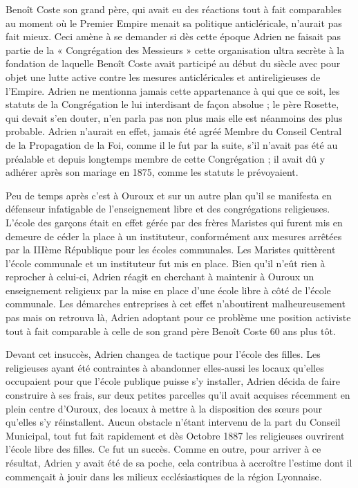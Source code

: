 \documentclass[11pt,a4paper]{report}
\begin{document}
Benoît Coste son grand père, qui avait eu des réactions tout à fait comparables au moment où le Premier Empire menait sa politique anticléricale, n'aurait pas fait mieux. Ceci amène à se demander si dès cette époque Adrien ne faisait pas partie de la « Congrégation des Messieurs » cette organisation ultra secrète à la fondation de laquelle Benoît Coste avait participé au début du siècle avec pour objet une lutte active contre les mesures anticléricales et antireligieuses de l'Empire. Adrien ne mentionna jamais cette appartenance à qui que ce soit, les statuts de la Congrégation le lui interdisant de façon absolue ; le père Rosette, qui devait s'en douter, n'en parla pas non plus mais elle est néanmoins des plus probable. Adrien n'aurait en effet, jamais été agréé Membre du Conseil Central de la Propagation de la Foi, comme il le fut par la suite, s'il n'avait pas été au préalable et depuis longtemps membre de cette Congrégation ; il avait dû y adhérer après son mariage en 1875, comme les statuts le prévoyaient.

Peu de temps après c'est à Ouroux et sur un autre plan qu'il se manifesta en défenseur infatigable de l'enseignement libre et des congrégations religieuses. L'école des garçons était en effet gérée par des frères Maristes qui furent mis en demeure de céder la place à un instituteur, conformément aux mesures arrêtées par la IIIème République pour les écoles communales. Les Maristes quittèrent l'école communale et un instituteur fut mis en place. Bien qu'il n'eût rien à reprocher à celui-ci, Adrien réagit en cherchant à maintenir à Ouroux un enseignement religieux par la mise en place d'une école libre à côté de l'école communale. Les démarches entreprises à cet effet n'aboutirent malheureusement pas mais on retrouva là, Adrien adoptant pour ce problème une position activiste tout à fait comparable à celle de son grand père Benoît Coste 60 ans plus tôt.

Devant cet insuccès, Adrien changea de tactique pour l'école des filles. Les religieuses ayant été contraintes à abandonner elles-aussi les locaux qu'elles occupaient pour que l'école publique puisse s'y installer, Adrien décida de faire construire à ses frais, sur deux petites parcelles qu'il avait acquises récemment en plein centre d'Ouroux, des locaux à mettre à la disposition des sœurs pour qu'elles s'y réinstallent. Aucun obstacle n'étant %
intervenu de la part du Conseil Municipal, tout fut fait rapidement et dès Octobre 1887 les religieuses ouvrirent l'école libre des filles. Ce fut un succès. Comme en outre, pour arriver à ce résultat, Adrien y avait été de sa poche, cela contribua à accroître l'estime dont il commençait à jouir dans les milieux ecclésiastiques de la région Lyonnaise.
\end{document}
